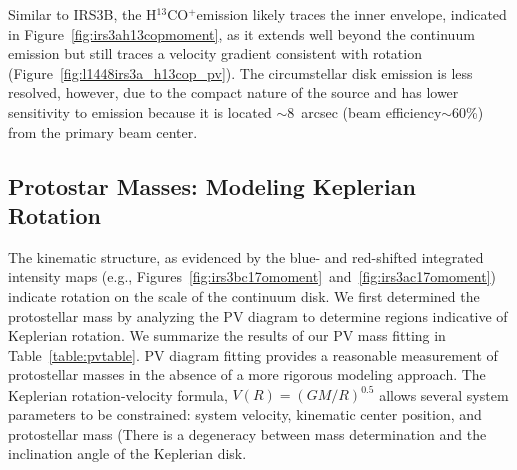 \documentclass[twocolumn, 12pt]{aastex63}
\newcommand{\htcop}{H$^{13}$CO$^+$}
\newcommand{\ab}{$\sim$}
\begin{document}
Similar to IRS3B, the \htcop\space emission likely traces the inner envelope, indicated in Figure~\ref{fig:irs3ah13copmoment}, as it extends well beyond the continuum emission but still traces a velocity gradient consistent with rotation (Figure~\ref{fig:l1448irs3a_h13cop_pv}). The circumstellar disk emission is less resolved, however, due to the compact nature of the source and has lower sensitivity to emission because it is located \ab8~arcsec (beam efficiency\ab60\%) from the primary beam center. 

\subsection{Protostar Masses: Modeling Keplerian Rotation}
The kinematic structure, as evidenced by the blue- and red-shifted integrated intensity maps (e.g., Figures~\ref{fig:irs3bc17omoment}~and~\ref{fig:irs3ac17omoment}) indicate rotation on the scale of the continuum disk. We first determined the protostellar mass by analyzing the PV diagram to determine regions indicative of Keplerian rotation. We summarize the results of our PV mass fitting in Table~\ref{table:pvtable}. PV diagram fitting provides a reasonable measurement of protostellar masses in the absence of a more rigorous modeling approach. The Keplerian rotation-velocity formula, $V(R) = (GM/R)^{0.5}$ allows several system parameters to be constrained: system velocity, kinematic center position, and protostellar mass (There is a degeneracy between mass determination and the inclination angle of the Keplerian disk. 
\end{document}
